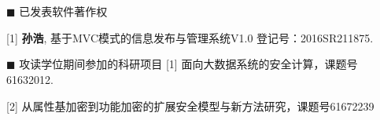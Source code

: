 \newpage
\section*{}
\vskip 5mm

{\heiti $\blacksquare$ 已发表软件著作权}\vskip 5mm

[1] \textbf{孙浩}, 基于MVC模式的信息发布与管理系统V1.0 登记号：2016SR211875. \vskip 5mm

{\heiti $\blacksquare$ 攻读学位期间参加的科研项目}\vskip 5mm
[1] 面向大数据系统的安全计算，课题号61632012.

[2] 从属性基加密到功能加密的扩展安全模型与新方法研究，课题号61672239
\bigskip\bigskip\bigskip

